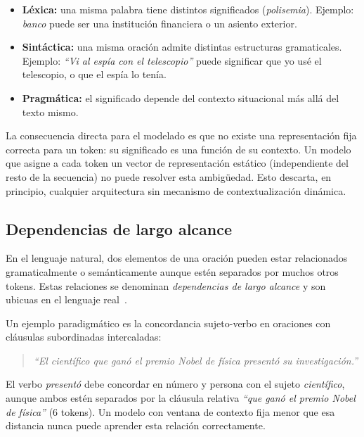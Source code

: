 \begin{itemize}
    \item \textbf{Léxica:} una misma palabra tiene distintos significados
    (\textit{polisemia}). Ejemplo: \textit{banco} puede ser una institución
    financiera o un asiento exterior.

    \item \textbf{Sintáctica:} una misma oración admite distintas
    estructuras gramaticales. Ejemplo: \textit{``Vi al espía con el
    telescopio''} puede significar que yo usé el telescopio, o que el
    espía lo tenía.

    \item \textbf{Pragmática:} el significado depende del contexto
    situacional más allá del texto mismo.
\end{itemize}



La consecuencia directa para el modelado es que no existe una representación
fija correcta para un token: su significado es una función de su contexto.
Un modelo que asigne a cada token un vector de representación estático
(independiente del resto de la secuencia) no puede resolver esta ambigüedad.
Esto descarta, en principio, cualquier arquitectura sin mecanismo de
contextualización dinámica.

\subsection{Dependencias de largo alcance}
\label{subsec:dependencias_largas}

En el lenguaje natural, dos elementos de una oración pueden estar
relacionados gramaticalmente o semánticamente aunque estén separados por
muchos otros tokens. Estas relaciones se denominan \textit{dependencias de
largo alcance} y son ubicuas en el lenguaje real~\cite{bengio2003neural}.

Un ejemplo paradigmático es la concordancia sujeto-verbo en oraciones con
cláusulas subordinadas intercaladas:

\begin{quote}
\textit{``El científico que ganó el premio Nobel de física presentó su investigación.''}
\end{quote}

El verbo \textit{presentó} debe concordar en número y persona con el sujeto
\textit{científico}, aunque ambos estén separados por la cláusula relativa
\textit{``que ganó el premio Nobel de física''} (6 tokens). Un modelo con
ventana de contexto fija menor que esa distancia nunca puede aprender esta
relación correctamente.

